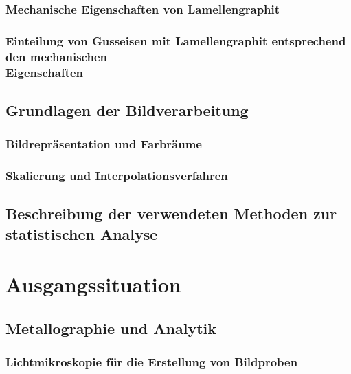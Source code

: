 \documentclass[
fontsize=10pt, 
listof = totoc,
parskip = half	
]{report}
\begin{document}
\subsection{Mechanische Eigenschaften von Lamellengraphit}
\label{subsec:MechanischeEigenschaften}

\subsection{Einteilung von Gusseisen mit Lamellengraphit entsprechend den mechanischen\\ Eigenschaften}
\label{subsec:EinteilungLamellengraphit}

\section{Grundlagen der Bildverarbeitung}
\label{GrundlagenBildverarbeitung}

\subsection{Bildrepräsentation und Farbräume}
\label{Bildrep}

\subsection{Skalierung und Interpolationsverfahren}
\label{subsec:SkalierungUndInterpolation}

\section{Beschreibung der verwendeten Methoden zur statistischen Analyse}
\label{sec:MethodenStatAnalyse}



\chapter{Ausgangssituation}
\label{ch:Ausgangssituation}

\section{Metallographie und Analytik}
\label{sec:MetallographieAnalytik}

\subsection{Lichtmikroskopie für die Erstellung von Bildproben}
\label{subsec:Lichtmikroskopie}
\end{document}
